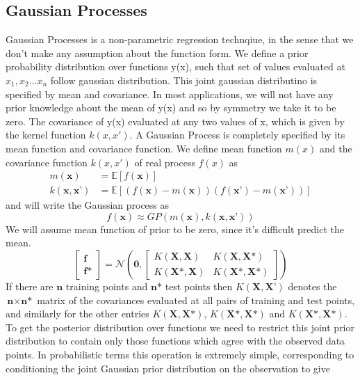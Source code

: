 \subsection{Gaussian Processes}
Gaussian Processes is a non-parametric regression technqiue, in the sense that we don't make any assumption about the function form. We define a prior probability distribution over functions y(x), such that set of values evaluated at $x_1, x_2 ... x_n$ follow gaussian distribution. This joint gaussian distributino is specified by mean and covariance. In most applications, we will not have any
prior knowledge about the mean of y(x) and so by symmetry we take it to be zero. The covariance of y(x) evaluated at any two values of x,
which is given by the kernel function $k(x, x')$.
A Gaussian Process is completely specified by its mean function and covariance function. We define mean function $m(x)$ and the covariance function $k(x, x')$ of real process $f(x)$ as
\begin{align}
	m(\textbf{x}) &= \mathbb{E}\left[ f(\textbf{x}) \right] \\
	k(\textbf{x}, \textbf{x'}) &= \mathbb{E} \left[ (f(\textbf{x})-m(\textbf{x}))(f(\textbf{x'})-m(\textbf{x'}))\right]
\end{align}
and will write the Gaussian process as
\begin{equation}
	f(\textbf{x}) \approx GP\left(m(\textbf{x}), k(\textbf{x},\textbf{x'})\right)
\end{equation}
We will assume mean function of prior to be zero, since it's difficult predict the mean.
\[
\begin{bmatrix}
	\textbf{f} \\ \textbf{f*}
\end{bmatrix} = \mathcal{N} \left( \textbf{0}, \begin{bmatrix}
K(\textbf{X}, \textbf{X}) & K(\textbf{X}, \textbf{X*})\\ K(\textbf{X*}, \textbf{X}) & K(\textbf{X*}, \textbf{X*}) 
\end{bmatrix} \right)
\]
If there are $\textbf{n}$ training points and $\textbf{n*}$ test points then $K(\textbf{X}, \textbf{X'})$ denotes the $\textbf{n} \times \textbf{n*}$ matrix of the covariances evaluated at all pairs of training and test points, and similarly for the other entries $K(\textbf{X}, \textbf{X*})$, $K(\textbf{X*}, \textbf{X*})$ and $K(\textbf{X*}, \textbf{X*})$. To get the posterior distribution over functions we need to restrict this joint prior distribution to contain only those functions which agree with the observed data points. In probabilistic terms this operation is extremely simple, corresponding to conditioning the joint Gaussian prior distribution on the observation to give
